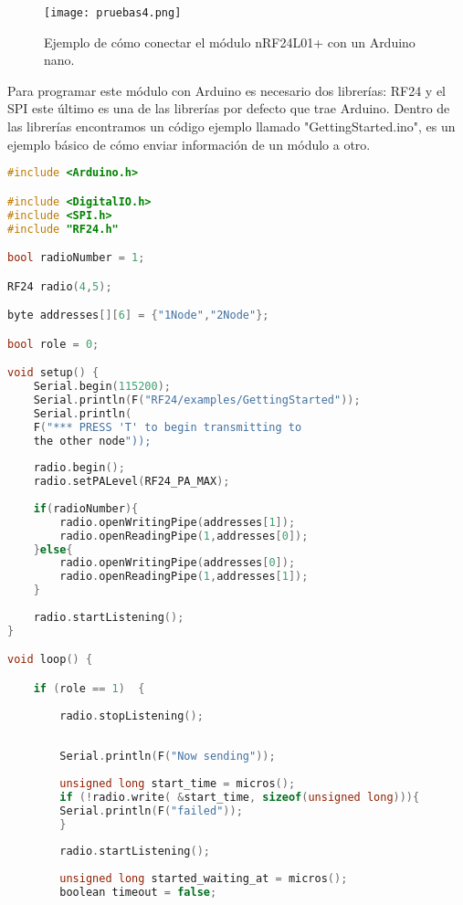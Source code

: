 \begin{figure}[H]
	\centering
	\texttt{[image: pruebas4.png]}
	\caption{Ejemplo de cómo conectar el módulo nRF24L01+ con un Arduino nano.}
\end{figure}

\par \noindent
Para programar este módulo con Arduino es necesario dos librerías: RF24\cite{rf24} y el SPI este último es una de las librerías por defecto que trae Arduino. Dentro de las librerías encontramos un código ejemplo llamado "GettingStarted.ino", es un ejemplo básico de cómo enviar información de un módulo a otro.

\begin{lstlisting}[language=C++, caption={Codigo Ejemplo para módulo nRF24L01+}, captionpos=b]
#include <Arduino.h>

#include <DigitalIO.h>
#include <SPI.h>
#include "RF24.h"

bool radioNumber = 1;

RF24 radio(4,5);

byte addresses[][6] = {"1Node","2Node"};

bool role = 0;

void setup() {
	Serial.begin(115200);
	Serial.println(F("RF24/examples/GettingStarted"));
	Serial.println(
	F("*** PRESS 'T' to begin transmitting to 
	the other node"));
	
	radio.begin();
	radio.setPALevel(RF24_PA_MAX);
	
	if(radioNumber){
		radio.openWritingPipe(addresses[1]);
		radio.openReadingPipe(1,addresses[0]);
	}else{
		radio.openWritingPipe(addresses[0]);
		radio.openReadingPipe(1,addresses[1]);
	}
	
	radio.startListening();
}

void loop() {

	if (role == 1)  {
	
		radio.stopListening();                                    
		
		
		Serial.println(F("Now sending"));
		
		unsigned long start_time = micros();                      
		if (!radio.write( &start_time, sizeof(unsigned long))){
		Serial.println(F("failed"));
		}
		
		radio.startListening();                                   
		
		unsigned long started_waiting_at = micros();              
		boolean timeout = false;                                  
		

\end{lstlisting}
